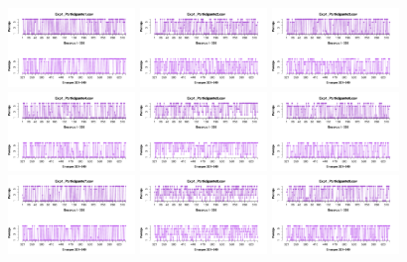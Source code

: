 \documentclass[a4paper ]{article}
\begin{document}
\begin{figure}[th]
\centering
\includegraphics[width=0.3\textwidth]{Figures/Rating_Exp1_P1} \includegraphics[width=0.3\textwidth]{Figures/Rating_Exp1_P2} \includegraphics[width=0.3\textwidth]{Figures/Rating_Exp1_P3}
\includegraphics[width=0.3\textwidth]{Figures/Rating_Exp1_P4} \includegraphics[width=0.3\textwidth]{Figures/Rating_Exp1_P5} \includegraphics[width=0.3\textwidth]{Figures/Rating_Exp1_P6}
\includegraphics[width=0.3\textwidth]{Figures/Rating_Exp1_P7} \includegraphics[width=0.3\textwidth]{Figures/Rating_Exp1_P8} \includegraphics[width=0.3\textwidth]{Figures/Rating_Exp1_P9}

\end{figure}
\end{document}
